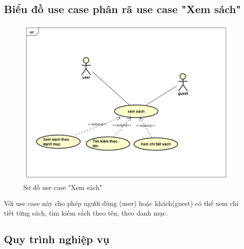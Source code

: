 \documentclass[../DoAn.tex]{subfiles}
\begin{document}
\subsection{Biểu đồ use case phân rã use case "Xem sách"}
\label{subsection:2.2.6}

\begin{figure}[H] %
\centering
\includegraphics[width=1\linewidth]{Hinhve/xem sách.png}
\caption{Sơ đồ use case "Xem sách"}
\label{fig:UsecaseBook}
\end{figure}
Với use case này cho phép người dùng (user) hoặc khách(guest) có thể xem chi tiết từng sách, tìm kiếm sách theo tên, theo danh mục.


\subsection{Quy trình nghiệp vụ}
\label{subsection:2.2.7}
\end{document}
